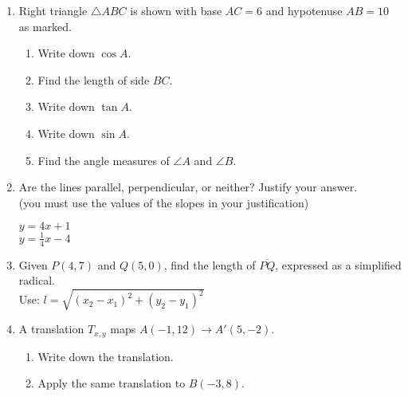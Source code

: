 \documentclass[12pt, twoside]{article}
\begin{document}
\begin{enumerate}
\item Right triangle $\triangle ABC$ is shown with base $AC=6$ and hypotenuse $AB=10$ as marked.\vspace{0.25cm}
\begin{multicols}{2}
  \begin{enumerate}[itemsep=0.5cm]
    \item Write down $\cos A$.
    \item Find the length of side $BC$.\vspace{1.5cm}
    \item Write down $\tan A$.
    \item Write down $\sin A$.
    \item Find the angle measures of $\angle A$ and $\angle B$.
    \vspace{1cm}
  \end{enumerate}
\begin{flushright}
\end{flushright}
\end{multicols} \vspace{1.5cm}

\item Are the lines parallel, perpendicular, or neither? Justify your answer. \\(you must use the values of the slopes in your justification)
  \begin{multicols}{2}
    $y = 4x+1$ \\
    $y = \frac{1}{4}x-4$
  \end{multicols}

\newpage
\item Given $P(4,7)$ and $Q(5,0)$, find the length of $\overline{PQ}$, expressed as a simplified radical.\\[0.25cm]
Use: $l=\sqrt{(x_2-x_1)^2+(y_2-y_1)^2}$
    \vspace{5cm}

\item A translation $T_{x,y}$ maps $A(-1,12) \rightarrow A'(5,-2)$. 
\begin{enumerate}
  \item Write down the translation. \vspace{1cm}
  \item Apply the same translation to $B(-3, 8)$.
\end{enumerate} \vspace{1.5cm}


\end{enumerate}
\end{document}
